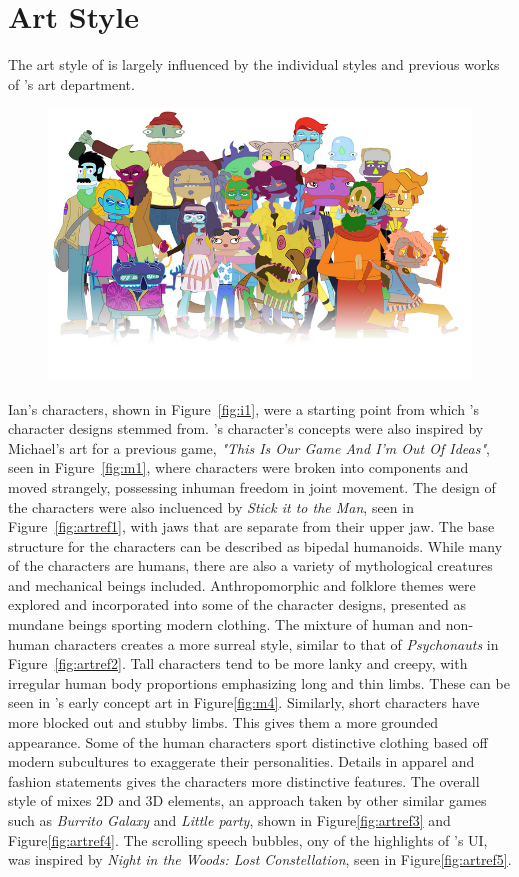 \section{Art Style}
The art style of \ourgame{} is largely influenced by the individual styles and previous works of \ourteam{}'s art department.

\begin{figure}[H]
\centering\includegraphics[width=0.7\linewidth]{images/art_style}
\end{figure}

\clearpage
Ian's characters, shown in Figure~\ref{fig:i1}, were a starting point from which \ourgame{}'s character designs stemmed from. \ourgame{}'s character's concepts were also inspired by Michael's art for a previous game, \textit{"This Is Our Game And I'm Out Of Ideas"}, seen in Figure~\ref{fig:m1}, where characters were broken into components and moved strangely, possessing inhuman freedom in joint movement. The design of the characters were also incluenced by \textit{Stick it to the Man}, seen in Figure~\ref{fig:artref1}, with jaws that are separate from their upper jaw.
The base structure for the characters can be described as bipedal humanoids. While many of the characters are humans, there are also a variety of mythological creatures and mechanical beings included. Anthropomorphic and folklore themes were explored and incorporated into some of the character designs, presented as mundane beings sporting modern clothing. The mixture of human and non-human characters creates a more surreal style, similar to that of \textit{Psychonauts} in Figure~\ref{fig:artref2}. 
Tall characters tend to be more lanky and creepy, with irregular human body proportions emphasizing long and thin limbs. These can be seen in \ourgame{}'s early concept art in Figure\ref{fig:m4}. Similarly, short characters have more blocked out and stubby limbs. This gives them a more grounded appearance. Some of the human characters sport distinctive clothing based off modern subcultures to exaggerate their personalities. Details in apparel and fashion statements gives the characters more distinctive features.
The overall style of \ourgame{} mixes 2D and 3D elements, an approach taken by other similar games such as \textit{Burrito Galaxy} and \textit{Little party}, shown in Figure\ref{fig:artref3} and Figure\ref{fig:artref4}. The scrolling speech bubbles, ony of the highlights of \ourgame{}'s UI, was inspired by \textit{Night in the Woods: Lost Constellation}, seen in Figure\ref{fig:artref5}.


